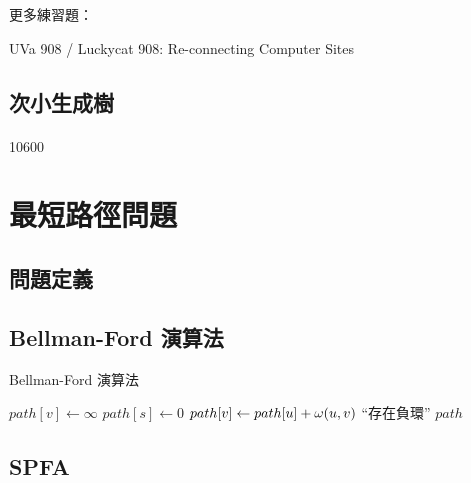 \documentclass[12pt,a4paper,oneside]{report}
\begin{document}
\begin{CJK}{UTF8}{bkai}
更多練習題：

UVa 908 / Luckycat 908: Re-connecting Computer Sites

\subsection{次小生成樹}
\paragraph{}10600

\section{最短路徑問題}
\subsection{問題定義}
\subsection{Bellman-Ford 演算法}

\begin{algorithm}
\label{algo-bellman-ford}
\caption{Bellman-Ford 演算法}
\begin{algorithmic}[1]
  \State{}
    \State $path[v]\gets\infty$
  \EndFor
  \State $path[s]\gets{0}$
        \State $path[v]\gets{path[u]+\omega{\ensuremath{({u},{v})}}}$
      \EndIf
    \EndFor
  \EndFor
      \State \Return ``存在負環''
    \EndIf
  \EndFor
  \State \Return $path$
\EndProcedure
\end{algorithmic}
\end{algorithm}

\subsection{SPFA}

\end{CJK}
\end{document}
